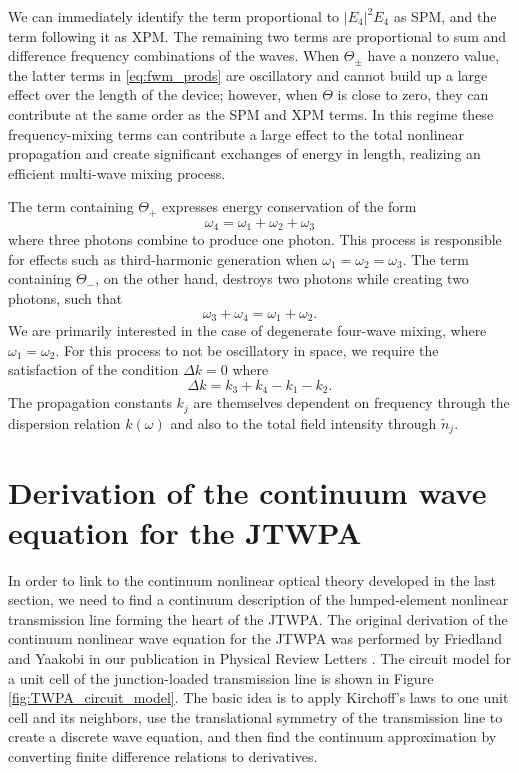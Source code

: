 We can immediately identify the term proportional to $|E_4|^2 E_4$ as SPM, and the term following it as XPM.  The remaining two terms are proportional to sum and difference frequency combinations of the waves.  When $\Theta_{\pm}$ have a nonzero value, the latter terms in \eqref{eq:fwm_prods} are oscillatory and cannot build up a large effect over the length of the device; however, when $\Theta$ is close to zero, they can contribute at the same order as the SPM and XPM terms.  In this regime these frequency-mixing terms can contribute a large effect to the total nonlinear propagation and create significant exchanges of energy in length, realizing an efficient multi-wave mixing process.

The term containing $\Theta_+$ expresses energy conservation of the form
\begin{equation}
\omega_4 = \omega_1 + \omega_2 + \omega_3
\end{equation}
where three photons combine to produce one photon.  This process is responsible for effects such as third-harmonic generation when $\omega_1 = \omega_2 = \omega_3$.  The term containing $\Theta_-$, on the other hand, destroys two photons while creating two photons, such that
\begin{equation}
\omega_3 + \omega_4 = \omega_1 + \omega_2.
\end{equation}
We are primarily interested in the case of degenerate four-wave mixing, where $\omega_1 = \omega_2$.  For this process to not be oscillatory in space, we require the satisfaction of the condition $\Delta k = 0$ where
\begin{equation}
\Delta k = k_3 + k_4 - k_1 - k_2.
\end{equation}
The propagation constants $k_j$ are themselves dependent on frequency through the dispersion relation $k(\omega)$ and also to the total field intensity through $\tilde{n}_j$.







\section{Derivation of the continuum wave equation for the JTWPA}\label{s:twpa_wave_eq}

In order to link to the continuum nonlinear optical theory developed in the last section, we need to find a continuum description of the lumped-element nonlinear transmission line forming the heart of the JTWPA.  The original derivation of the continuum nonlinear wave equation for the JTWPA was performed by Friedland and Yaakobi in our publication in Physical Review Letters \cite{Yaakobi:2013kx}.  The circuit model for a unit cell of the junction-loaded transmission line is shown in Figure \ref{fig:TWPA_circuit_model}. The basic idea is to apply Kirchoff's laws to one unit cell and its neighbors, use the translational symmetry of the transmission line to create a discrete wave equation, and then find the continuum approximation by converting finite difference relations to derivatives.

